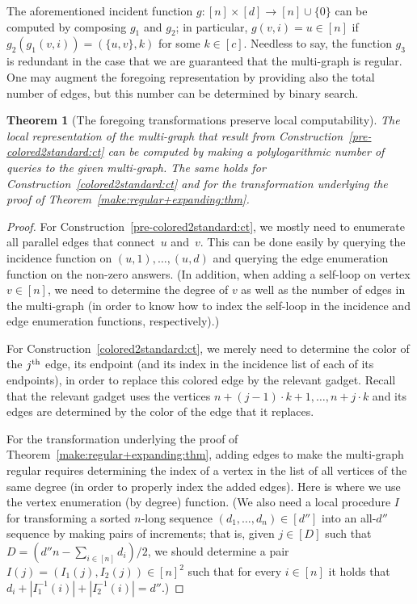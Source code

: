 \documentclass[10pt,a4paper]{article}
\newtheorem{theorem}{Theorem}[section]
\theoremstyle{definition}
\newcommand{\xth}{{\rm th}}
\newcommand{\BT}{\begin{theorem}}   \newcommand{\ET}{\end{theorem}}
\newcommand{\BPF}{\begin{proof}} \newcommand{\EPF}{\end{proof}}
\begin{document}
The aforementioned incident function $g:[n]\times[d]\to[n]\cup\{0\}$
can be computed by composing $g_1$ and $g_2$;
in particular, $g(v,i)=u\in[n]$ if $g_2(g_1(v,i))=(\{u,v\},k)$
for some $k\in[c]$.
Needless to say, the function $g_3$ is redundant in the case
that we are guaranteed that the multi-graph is regular.
%
%
One may augment the foregoing representation by providing also
the total number of edges, but this number can be determined
by binary search.
%

\BT[The foregoing transformations preserve local computability]
\label{local-computability:thm}
The local representation of the multi-graph that
result from Construction~\ref{pre-colored2standard:ct}
can be computed by making a polylogarithmic number of queries
to the given multi-graph.
The same holds for Construction~\ref{colored2standard:ct}
and for the transformation underlying
the proof of Theorem~\ref{make:regular+expanding:thm}.
\ET

\BPF
For Construction~\ref{pre-colored2standard:ct},
we mostly need to enumerate all parallel edges
that connect~$u$ and~$v$. This can be done easily
by querying the incidence function on $(u,1),\ldots,(u,d)$
and querying the edge enumeration function on the non-zero answers.
(In addition, when adding a self-loop on vertex $v\in[n]$,
we need to determine the degree of $v$
as well as the number of edges in the multi-graph
(in order to know how to index the self-loop
in the incidence and edge enumeration functions, respectively).)

For Construction~\ref{colored2standard:ct},
we merely need to determine the color of the $j^\xth$ edge,
its endpoint
(and its index in the incidence list of each of its endpoints),
in order to replace this colored edge by the relevant gadget.
Recall that the relevant gadget
uses the vertices $n+(j-1)\cdot k+1,\ldots,n+j\cdot k$
and its edges are determined by the color of the edge that it replaces.

For the transformation underlying
the proof of Theorem~\ref{make:regular+expanding:thm},
adding edges to make the multi-graph regular requires
determining the index of a vertex in the list of all vertices
of the same degree (in order to properly index the added edges).
Here is where we use the vertex enumeration (by degree) function.
(We also need a local procedure $I$ for transforming
a sorted $n$-long sequence $(d_1,\ldots,d_n)\in[d'']$
into an all-$d''$ sequence by making pairs of increments;
that is, given $j\in[D]$ such that $D=(d''n-\sum_{i\in[n]}d_i)/2$,
we should determine a pair $I(j)=(I_1(j),I_2(j))\in[n]^2$
such that for every $i\in[n]$ it holds
that $d_i+|I_1^{-1}(i)|+|I_2^{-1}(i)|=d''$.)
\EPF
\end{document}
